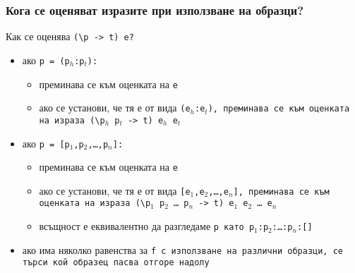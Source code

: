 \documentclass{beamer}
\begin{document}
\begin{frame}
  \frametitle{Кога се оценяват изразите при използване на образци?}
  Как се оценява \tt{(\textbackslash p -> t) e}?
  \begin{itemize}[<+->]
  \item ако \tt{p = (p$_h$:p$_t$)}:
    \begin{itemize}
    \item преминава се към оценката на \tt e
    \item ако се установи, че тя е от вида \tt{(e$_h$:e$_t$)}, преминава се към оценката на израза \tt{(\textbackslash p$_h$ p$_t$ -> t) e$_h$ e$_t$}
    \end{itemize}
  \item ако \tt{p = [p$_1$,p$_2$,\ldots,p$_n$]}:
    \begin{itemize}
    \item преминава се към оценката на \tt e
    \item ако се установи, че тя е от вида \tt{[e$_1$,e$_2$,\ldots,e$_n$]}, преминава се към оценката на израза \tt{(\textbackslash p$_1$ p$_2$ \ldots\ p$_n$ -> t) e$_1$ e$_2$ \ldots\ e$_n$}
    \item всъщност е еквивалентно да разгледаме \tt p като \tt{p$_1$:p$_2$:\ldots:p$_n$:[]}
    \end{itemize}
  \item ако има няколко равенства за \tt f с използване на различни образци, се търси кой образец пасва отгоре надолу
  \end{itemize}
\end{frame}
\end{document}
